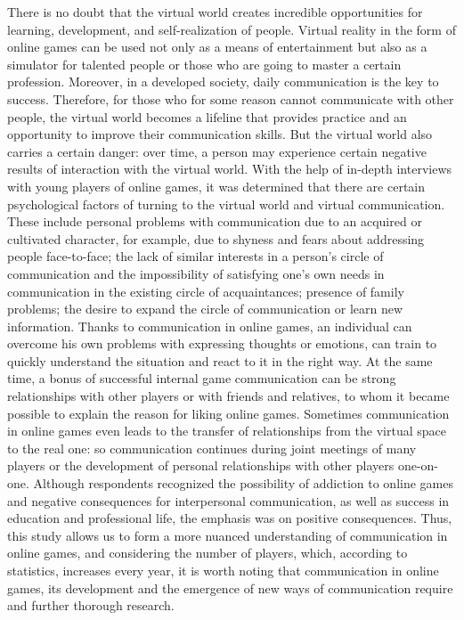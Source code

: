 \documentclass[10pt,twoside,slovak,a4paper]{article}
\begin{document}
  There is no doubt that the virtual world creates incredible opportunities for learning, development, and self-realization of people. Virtual reality in the form of online games can be used not only as a means of entertainment but also as a simulator for talented people or those who are going to master a certain profession. Moreover, in a developed society,  daily communication is the key to success. Therefore, for those who for some reason cannot communicate with other people, the virtual world becomes a lifeline that provides practice and an opportunity to improve their communication skills. But the virtual world also carries a certain danger: over time, a person may experience certain negative results of interaction with the virtual world. With the help of in-depth interviews with young players of online games, it was determined that there are certain psychological factors of turning to the virtual world and virtual communication. These include personal problems with communication due to an acquired or cultivated character, for example, due to shyness and fears about addressing people face-to-face; the lack of similar interests in a person's circle of communication and the impossibility of satisfying one's own needs in communication in the existing circle of acquaintances; presence of family problems; the desire to expand the circle of communication or learn new information. Thanks to communication in online games, an individual can overcome his own problems with expressing thoughts or emotions, can train to quickly understand the situation and react to it in the right way. At the same time, a bonus of successful internal game communication can be strong relationships with other players or with friends and relatives, to whom it became possible to explain the reason for liking online games. Sometimes communication in online games even leads to the transfer of relationships from the virtual space to the real one: so communication continues during joint meetings of many players or the development of personal relationships with other players one-on-one. Although respondents recognized the possibility of addiction to online games and negative consequences for interpersonal communication, as well as success in education and professional life, the emphasis was on positive consequences. Thus, this study allows us to form a more nuanced understanding of communication in online games, and considering the number of players, which, according to statistics, increases every year, it is worth noting that communication in online games, its development and the emergence of new ways of communication require and further thorough research.







\end{document}
